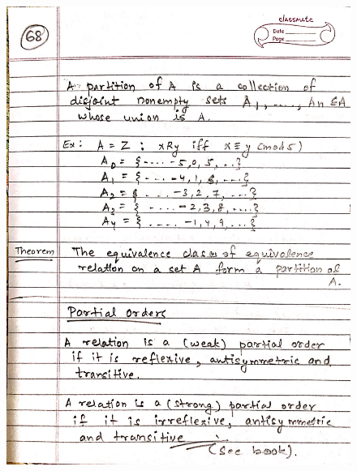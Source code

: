 \begin{figure}[H]
    \centering
    \includegraphics[scale=0.25]{"./MIT-6.042J/MIT-6042J-068"}
\end{figure}
\newpage
